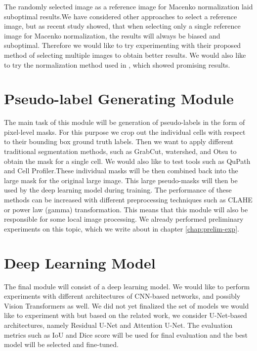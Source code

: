 The randomly selected image as a reference image for Macenko normalization laid suboptimal results.We have considered other approaches to select a reference image, but as recent study \cite{Ivanov2024} showed, that when selecting only a single reference image for Macenko normalization, the results will always be biased and suboptimal. Therefore we would like to try experimenting with their proposed method of selecting multiple images to obtain better results. We would also like to try the normalization method used in \cite{Vahadane2015}, which showed promising results.

\section{Pseudo-label Generating Module}
The main task of this module will be generation of pseudo-labels in the form of pixel-level masks. For this purpose we crop out the individual cells with respect to their bounding box ground truth labels. Then we want to apply different traditional segmentation methods, such as GrabCut, watershed, and Otsu to obtain the mask for a single cell. We would also like to test tools such as QuPath and Cell Profiler.These individual masks will be then combined back into the large mask for the original large image. This large pseudo-masks will then be used by the deep learning model during training. The performance of these methods can be increased with different preprocessing techniques such as CLAHE or power law (gamma) transformation. This means that this module will also be responsible for some local image processing. We already performed preliminary experiments on this topic, which we write about in chapter \ref{chap:prelim-exp}.

\section{Deep Learning Model}
The final module will consist of a deep learning model. We would like to perform experiments with different architectures of CNN-based networks, and possibly Vision Transformers as well. We did not yet finalized the set of models we would like to experiment with but based on the related work, we consider U-Net-based architectures, namely Residual U-Net and Attention U-Net. The evaluation metrics such as IoU and Dice score will be used for final evaluation and the best model will be selected and fine-tuned.

